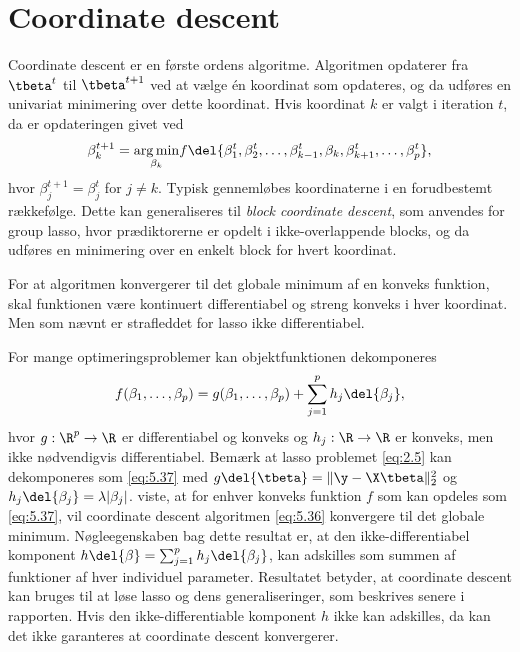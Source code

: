\section{Coordinate descent}
%
Coordinate descent er en første ordens algoritme.
Algoritmen opdaterer fra \(\tbeta^t\) til \(\tbeta^{t+1}\) ved at vælge én koordinat som opdateres, og da udføres en univariat minimering over dette koordinat.
Hvis koordinat $k$ er valgt i iteration $t$, da er opdateringen givet ved
\begin{align}
\beta_k^{t+1} =\underset{ \beta_k}{\arg \min}  f\del{ \beta_1^t, \beta_2^t, \dots, \beta_{k-1}^t, \beta_k, \beta_{k+1}^t, \dots, \beta_p^t  }, \label{eq:5.36}
\end{align}
hvor $\beta_j^{t+1} = \beta_j^t$ for $j \neq k$. 
Typisk gennemløbes koordinaterne i en forudbestemt rækkefølge.
Dette kan generaliseres til \textit{block coordinate descent}, som anvendes for group lasso, hvor prædiktorerne er opdelt i ikke-overlappende blocks, og da udføres en minimering over en enkelt block for hvert koordinat.

For at algoritmen konvergerer til det globale minimum af en konveks funktion, skal funktionen være kontinuert differentiabel og streng konveks i hver koordinat. 
Men som nævnt er strafleddet for lasso ikke differentiabel.

For mange optimeringsproblemer kan objektfunktionen dekomponeres
\begin{align}
f(\beta_1, \dots, \beta_p) = g(\beta_1, \dots, \beta_p) + \sum_{j = 1}^p h_j \del{\beta_j}, \label{eq:5.37}
\end{align}
hvor \(g: \R^p \rightarrow \R\) er differentiabel og konveks og \(h_j: \R \rightarrow \R\) er konveks, men ikke nødvendigvis differentiabel.
Bemærk at lasso problemet \eqref{eq:2.5} kan dekomponeres som \eqref{eq:5.37} med \(g \del{\tbeta} =\Vert \y - \X \tbeta \Vert_2^2\) og \(h_j \del{\beta_j} = \lambda \vert \beta_j \vert\).
\citep{Tseng_coordinate} viste, at for enhver konveks funktion \(f\) som kan opdeles som \eqref{eq:5.37}, vil coordinate descent algoritmen \eqref{eq:5.36} konvergere til det globale minimum. 
Nøgleegenskaben bag dette resultat er, at den ikke-differentiabel komponent \(h \del{\beta} = \sum_{j=1}^p h_j \del{\beta_j}\), kan adskilles som summen af funktioner af hver individuel parameter.
Resultatet betyder, at coordinate descent kan bruges til at løse lasso og dens generaliseringer, som beskrives senere i rapporten.
Hvis den ikke-differentiable komponent \(h\) ikke kan adskilles, da kan det ikke garanteres at coordinate descent konvergerer.

